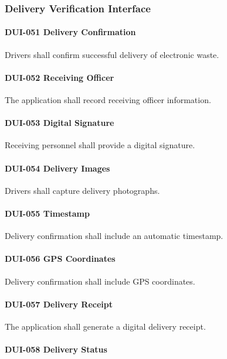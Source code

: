 \subsubsection*{Delivery Verification Interface}

\paragraph{DUI-051 Delivery Confirmation}

Drivers shall confirm successful delivery of electronic waste.

\paragraph{DUI-052 Receiving Officer}

The application shall record receiving officer information.

\paragraph{DUI-053 Digital Signature}

Receiving personnel shall provide a digital signature.

\paragraph{DUI-054 Delivery Images}

Drivers shall capture delivery photographs.

\paragraph{DUI-055 Timestamp}

Delivery confirmation shall include an automatic timestamp.

\paragraph{DUI-056 GPS Coordinates}

Delivery confirmation shall include GPS coordinates.

\paragraph{DUI-057 Delivery Receipt}

The application shall generate a digital delivery receipt.

\paragraph{DUI-058 Delivery Status}

